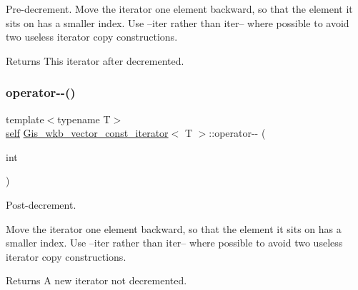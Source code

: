 Pre-\/decrement. Move the iterator one element backward, so that the element it sits on has a smaller index. Use --iter rather than iter-- where possible to avoid two useless iterator copy constructions. 

\begin{DoxyReturn}{Returns}
This iterator after decremented. 
\end{DoxyReturn}
\mbox{\label{classGis__wkb__vector__const__iterator_a979655b875007b53d94dcf03065f88d8}} 
\subsubsection{\texorpdfstring{operator-\/-\/()}{operator--()}\hspace{0.1cm}{\footnotesize\ttfamily [2/2]}}
{\footnotesize\ttfamily template$<$typename T$>$ \\
\mbox{\hyperlink{classGis__wkb__vector__const__iterator}{self}} \mbox{\hyperlink{classGis__wkb__vector__const__iterator}{Gis\+\_\+wkb\+\_\+vector\+\_\+const\+\_\+iterator}}$<$ T $>$\+::operator-\/-\/ (\begin{DoxyParamCaption}\item[{int}]{ }\end{DoxyParamCaption})\hspace{0.3cm}{\ttfamily [inline]}}



Post-\/decrement. 

Move the iterator one element backward, so that the element it sits on has a smaller index. Use --iter rather than iter-- where possible to avoid two useless iterator copy constructions. \begin{DoxyReturn}{Returns}
A new iterator not decremented. 
\end{DoxyReturn}
\mbox{\label{classGis__wkb__vector__const__iterator_a9a679f7fb5602553fadd480b08bee2f8}} 
